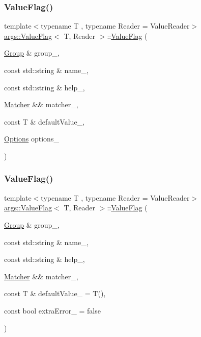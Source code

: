 \subsubsection{\texorpdfstring{Value\+Flag()}{ValueFlag()}\hspace{0.1cm}{\footnotesize\ttfamily [1/3]}}
{\footnotesize\ttfamily template$<$typename T , typename Reader  = Value\+Reader$>$ \\
\hyperlink{classargs_1_1_value_flag}{args\+::\+Value\+Flag}$<$ T, Reader $>$\+::\hyperlink{classargs_1_1_value_flag}{Value\+Flag} (\begin{DoxyParamCaption}\item[{\hyperlink{classargs_1_1_group}{Group} \&}]{group\+\_\+,  }\item[{const std\+::string \&}]{name\+\_\+,  }\item[{const std\+::string \&}]{help\+\_\+,  }\item[{\hyperlink{classargs_1_1_matcher}{Matcher} \&\&}]{matcher\+\_\+,  }\item[{const T \&}]{default\+Value\+\_\+,  }\item[{\hyperlink{namespaceargs_aa530c0f95194aa275f49a5f299ac9e77}{Options}}]{options\+\_\+ }\end{DoxyParamCaption})\hspace{0.3cm}{\ttfamily [inline]}}

\mbox{\label{classargs_1_1_value_flag_ae2be9efefe2226c5fc9922e962c0d077}} 
\subsubsection{\texorpdfstring{Value\+Flag()}{ValueFlag()}\hspace{0.1cm}{\footnotesize\ttfamily [2/3]}}
{\footnotesize\ttfamily template$<$typename T , typename Reader  = Value\+Reader$>$ \\
\hyperlink{classargs_1_1_value_flag}{args\+::\+Value\+Flag}$<$ T, Reader $>$\+::\hyperlink{classargs_1_1_value_flag}{Value\+Flag} (\begin{DoxyParamCaption}\item[{\hyperlink{classargs_1_1_group}{Group} \&}]{group\+\_\+,  }\item[{const std\+::string \&}]{name\+\_\+,  }\item[{const std\+::string \&}]{help\+\_\+,  }\item[{\hyperlink{classargs_1_1_matcher}{Matcher} \&\&}]{matcher\+\_\+,  }\item[{const T \&}]{default\+Value\+\_\+ = {\ttfamily T()},  }\item[{const bool}]{extra\+Error\+\_\+ = {\ttfamily false} }\end{DoxyParamCaption})\hspace{0.3cm}{\ttfamily [inline]}}

